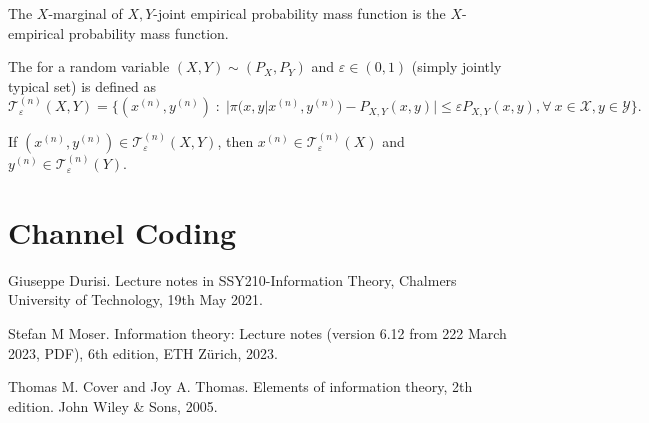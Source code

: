 \documentclass[11pt,a4paper]{article}
\begin{document}
\begin{remark}
    The $X$-marginal of $X,Y$-joint empirical probability mass function is the $X$-empirical probability mass function.
\end{remark}

\begin{definition}
    The  for a random variable $(X,Y)\sim (P_X,P_Y)$ and $\varepsilon \in (0,1)$ (simply jointly typical set) is defined as
    \begin{equation*}
        \mathcal{T}^{(n)}_\varepsilon (X,Y) = \{(x^{(n)},y^{(n)})\;:\; |\pi(x,y|x^{(n)},y^{(n)}) - P_{X,Y}(x,y)| \le \varepsilon P_{X,Y}(x,y), \forall\ x\in\mathcal{X}, y\in\mathcal{Y}\}.
    \end{equation*}
\end{definition}

\begin{remark}
    If $(x^{(n)},y^{(n)})\in \mathcal{T}_\varepsilon^{(n)}(X,Y)$, then $x^{(n)}\in \mathcal{T}_\varepsilon^{(n)}(X)$ and $y^{(n)}\in \mathcal{T}_\varepsilon^{(n)}(Y)$.
\end{remark}

\section{Channel Coding}

% 
% 

\begin{thebibliography}{9}
    Giuseppe Durisi. Lecture notes in SSY210-Information Theory, Chalmers University of Technology, 19th May 2021.

    Stefan M Moser. Information theory: Lecture notes (version 6.12 from 222 March 2023, PDF), 6th edition, ETH Z{ü}rich, 2023.

    Thomas M. Cover and Joy A. Thomas. Elements of information theory, 2th edition. John Wiley \& Sons, 2005.

        
\end{thebibliography}
        
    
\end{document}
